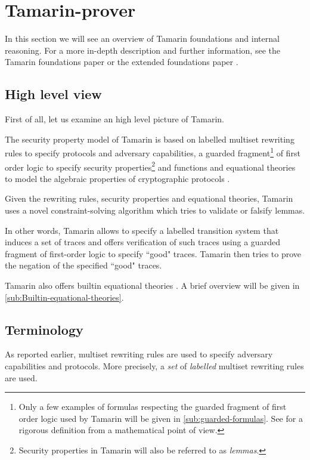 \section{Tamarin-prover}
In this section we will see an overview of Tamarin foundations and internal reasoning.
For a more in-depth description and further information, see the Tamarin foundations paper \cite{TamarinFoundations} or the extended foundations paper \cite{TamarinFoundationsExtended}.

\subsection{High level view}
First of all, let us examine an high level picture of Tamarin.

The security property model of Tamarin is based on labelled multiset rewriting rules to specify protocols and adversary capabilities, a guarded fragment\footnote{Only a few examples of formulas respecting the guarded fragment of first order logic used by Tamarin will be given in \cref{sub:guarded-formulas}. See \cite{FragmentFirstOrderLogicPaper} for a rigorous definition from a mathematical point of view.} of first order logic to specify security properties\footnote{Security properties in Tamarin will also be referred to as \textit{lemmas}.} and functions and equational theories to model the algebraic properties of cryptographic protocols \cite{TamarinFoundations}.

Given the rewriting rules, security properties and equational theories, Tamarin uses a novel constraint-solving algorithm which tries to validate or falsify lemmas.

In other words, Tamarin allows to specify a labelled transition system that induces a set of traces and offers verification of such traces using a guarded fragment of first-order logic to specify ``good" traces. Tamarin then tries to prove the negation of the specified ``good" traces.

Tamarin also offers builtin equational theories \cite{TamarinProverManual}. A brief overview will be given in \cref{sub:Builtin-equational-theories}.

\subsection{Terminology}
As reported earlier, multiset rewriting rules are used to specify adversary capabilities and protocols. More precisely, a \textit{set} of \textit{labelled} multiset rewriting rules are used.

